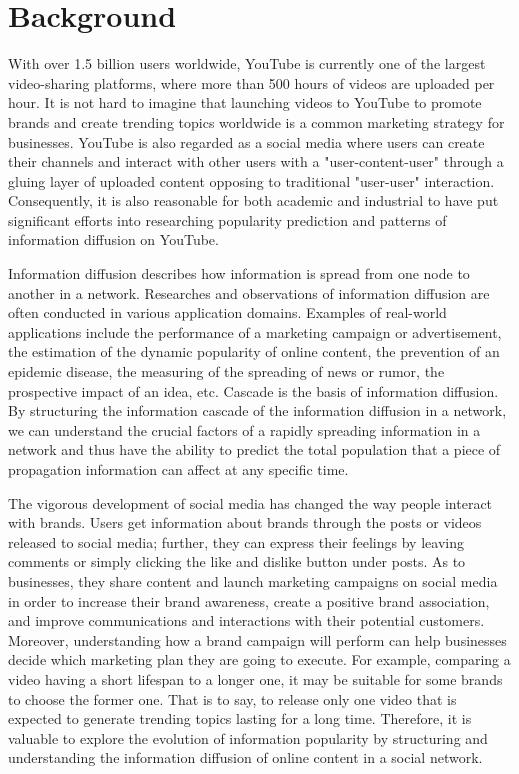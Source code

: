 \section{Background}

With over 1.5 billion users worldwide, YouTube is currently one of the largest video-sharing platforms, where more than 500 hours of videos are uploaded per hour. It is not hard to imagine that launching videos to YouTube to promote brands and create trending topics worldwide is a common marketing strategy for businesses. YouTube is also regarded as a social media where users can create their channels and interact with other users with a "user-content-user" through a gluing layer of uploaded content opposing to traditional "user-user" interaction. Consequently, it is also reasonable for both academic and industrial to have put significant efforts into researching popularity prediction and patterns of information diffusion on YouTube.

Information diffusion describes how information is spread from one node to another in a network. Researches and observations of information diffusion are often conducted in various application domains. Examples of real-world applications include the performance of a marketing campaign or advertisement, the estimation of the dynamic popularity of online content, the prevention of an epidemic disease, the measuring of the spreading of news or rumor, the prospective impact of an idea, etc. Cascade is the basis of information diffusion. By structuring the information cascade of the information diffusion in a network, we can understand the crucial factors of a rapidly spreading information in a network and thus have the ability to predict the total population that a piece of propagation information can affect at any specific time.

The vigorous development of social media has changed the way people interact with brands. Users get information about brands through the posts or videos released to social media; further, they can express their feelings by leaving comments or simply clicking the like and dislike button under posts. As to businesses, they share content and launch marketing campaigns on social media in order to increase their brand awareness, create a positive brand association, and improve communications and interactions with their potential customers. Moreover, understanding how a brand campaign will perform can help businesses decide which marketing plan they are going to execute. For example, comparing a video having a short lifespan to a longer one, it may be suitable for some brands to choose the former one. That is to say, to release only one video that is expected to generate trending topics lasting for a long time. Therefore, it is valuable to explore the evolution of information popularity by structuring and understanding the information diffusion of online content in a social network.




